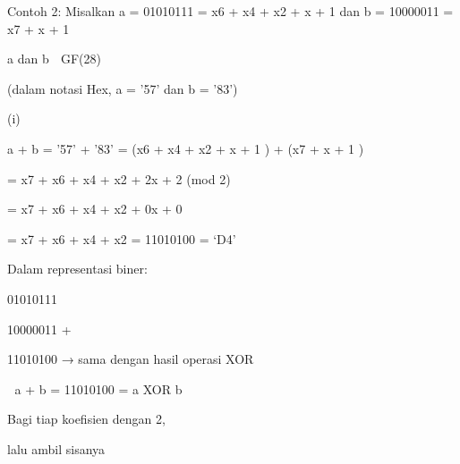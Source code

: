\documentclass{article}
\begin{document}

Contoh 2:  Misalkan a = 01010111 = x6 + x4 + x2 + x + 1  dan b = 10000011 = x7 + x + 1 


   a dan b  GF(28) 

  (dalam notasi Hex, a = ’57’ dan b = ’83’)

(i)

a + b = ’57’ + ’83’  =  (x6 + x4 + x2 + x + 1 ) +  (x7 + x + 1 ) 




= x7 + x6 + x4 + x2 + 2x + 2 (mod 2)



             = x7 + x6 + x4 + x2 + 0x  + 0




= x7 + x6 + x4 + x2 = 11010100 = ‘D4’


Dalam representasi biner:


 01010111


 10000011 +


 11010100  → sama dengan hasil operasi XOR


 a + b = 11010100 = a XOR b 

Bagi  tiap koefisien dengan 2,

lalu ambil sisanya
\end{document}

